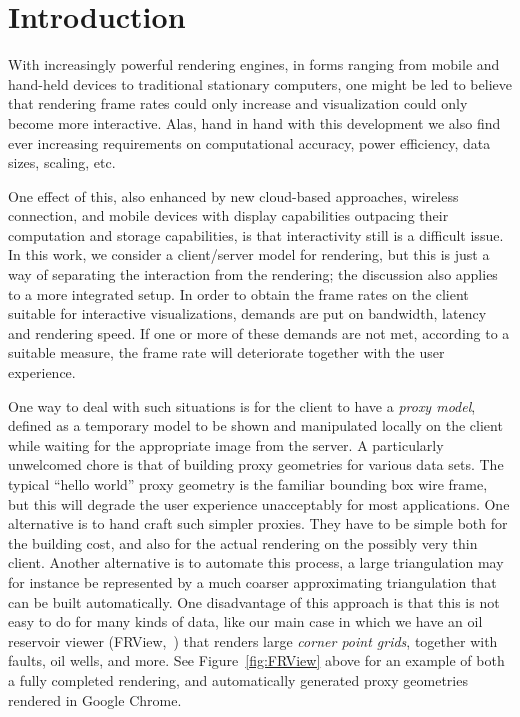 \section{Introduction}

With increasingly powerful rendering engines, in forms ranging from mobile and
hand-held devices to traditional stationary computers, one might be led to
believe that rendering frame rates could only increase and visualization could
only become more interactive. Alas, hand in hand with this development we also
find ever increasing requirements on computational accuracy, power efficiency,
data sizes, scaling, etc.

One effect of this, also enhanced by new cloud-based approaches, wireless
connection, and mobile devices with display capabilities outpacing their
computation and storage capabilities, is that interactivity still is a difficult
issue. In this work, we consider a client/server model for rendering, but this
is just a way of separating the interaction from the rendering; the discussion
also applies to a more integrated setup.  In order to obtain the frame rates on
the client suitable for interactive visualizations, demands are put on
bandwidth, latency and rendering speed. If one or more of these demands are not
met, according to a suitable measure, the frame rate will deteriorate together
with the user experience.

One way to deal with such situations is for the client to have a {\em proxy
model}, defined as a temporary model to be shown and manipulated locally on the
client while waiting for the appropriate image from the server.  A particularly
unwelcomed chore is that of building proxy geometries for various data sets. The
typical ``hello world'' proxy geometry is the familiar bounding box wire frame,
but this will degrade the user experience unacceptably for most
applications. One alternative is to hand craft such simpler proxies. They have
to be simple both for the building cost, and also for the actual rendering on
the possibly very thin client. Another alternative is to automate this process,
a large triangulation may for instance be represented by a much coarser
approximating triangulation that can be built automatically. One disadvantage of
this approach is that this is not easy to do for many kinds of data, like our
main case in which we have an oil reservoir viewer (FRView,~\cite{cloudviz})
that renders large {\em corner point grids}, together with faults, oil wells,
and more. See Figure~\ref{fig:FRView} above for an example of both a fully
completed rendering, and automatically generated proxy geometries rendered in
Google Chrome.

